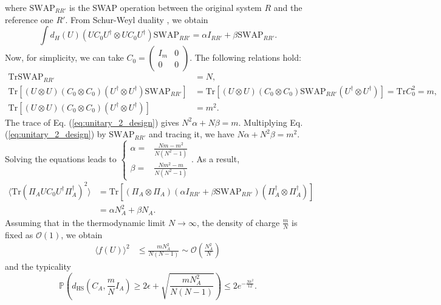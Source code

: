 where $\mathrm{SWAP}_{RR'}$ is the SWAP operation between the original
system $R$ and the reference one $R'$. From Schur-Weyl duality \citep{Hayashi2017}, we obtain
\begin{equation}
\int d_{H}(U)(UC_{0}U^{\dagger}\otimes  UC_{0}U^{\dagger})\mathrm{SWAP}_{RR'}=\alpha I_{RR'}+\beta\mathrm{SWAP}_{RR'}.
\label{eq:unitary_2_design}
\end{equation}
Now, for simplicity, we can take $C_{0}=\begin{pmatrix}I_{m} & 0\\
0 & 0
\end{pmatrix}$. The following relations hold:
\begin{align*}
\text{Tr}\mathrm{SWAP}_{RR'} & =N,\\
\mathrm{Tr}[(U\otimes  U)(C_{0}\otimes  C_{0}) (U^{\dagger}\otimes  U^{\dagger})\mathrm{SWAP}_{RR'}] & =\mathrm{Tr}[(U\otimes  U)(C_{0}\otimes  C_{0})\mathrm{SWAP}_{RR'} (U^{\dagger}\otimes  U^{\dagger})] =\mathrm{Tr}C_{0}^{2}=m,\\
\mathrm{Tr}[(U\otimes  U) (C_{0}\otimes  C_{0}) (U^{\dagger}\otimes  U^{\dagger})] & =m^{2}.
\end{align*}
The trace of Eq. (\ref{eq:unitary_2_design}) gives $N^{2}\alpha+N\beta=m$.
Multiplying Eq. (\ref{eq:unitary_2_design}) by $\mathrm{SWAP}_{RR'}$
and tracing it, we have $N\alpha+N^{2}\beta=m^{2}$. Solving the equations
leads to $\begin{cases}
\alpha= & \frac{Nm-m^{2}}{N(N^{2}-1)}\\
\beta= & \frac{Nm^{2}-m}{N(N^{2}-1)}
\end{cases}.$ As a result, ~
\begin{align}
\langle\mathrm{Tr}(\Pi_{A}UC_{0}U^{\dagger}\Pi_{A}^{\dagger})^{2}\rangle & =\mathrm{Tr}[(\Pi_{A}\otimes \Pi_{A})(\alpha I_{RR'}+\beta\mathrm{SWAP}_{RR'})(\Pi_{A}^{\dagger}\otimes \Pi_{A}^{\dagger}\nonumber)] \\
 & =\alpha N_{A}^{2}+\beta N_{A}.
 \label{eq:value_of_average_of_tracesquare}
\end{align}
Assuming that in the thermodynamic limit $N\to\infty$, the density of charge
$\frac{m}{N}$ is fixed as $\mathcal{O}(1)$, we obtain
\begin{align*}
\langle f(U)\rangle^{2} & \leq\frac{mN_{A}^{2}}{N(N-1)}\sim \mathcal{O}\left(\frac{N_{A}^{2}}{N}\right)
\end{align*}
and the typicality
\begin{equation}
\mathbb{P}\left(d_{\mathrm{HS}}\left(C_{A},\frac{m}{N}I_{A}\right)\geq2\epsilon+\sqrt{\frac{mN_{A}^{2}}{N(N-1)}}\right)\leq2e^{-\frac{N\epsilon^{2}}{12}}.
\label{eq:meassure_concentration_on_covariance_matrix}
\end{equation}

